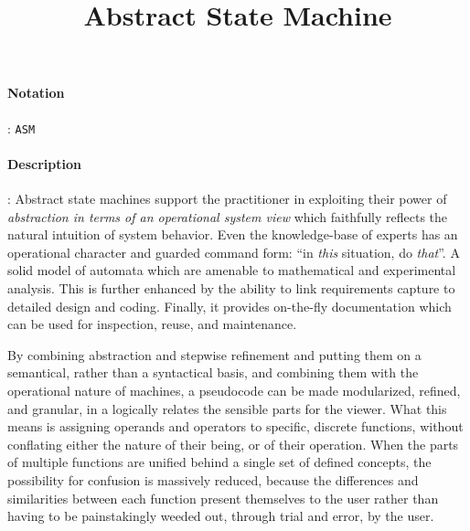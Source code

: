\documentclass[10pt,a4paper,oneside]{scrartcl}
\title{Abstract State Machine}
\date{}
\begin{document}
\maketitle
\paragraph{Notation}: \texttt{ASM}
\paragraph{Description}: Abstract state machines support the practitioner in exploiting their power of \textsl{abstraction in terms of an operational system view} which faithfully reflects the natural intuition of system behavior. Even the knowledge-base of experts has an operational character and guarded command form: ``in \textit{this} situation, do \textit{that}''. A solid model of automata which are amenable to mathematical and experimental analysis. This is further enhanced by the ability to link requirements capture to detailed design and coding. Finally, it provides on-the-fly documentation which can be used for inspection, reuse, and maintenance.
\par 

By combining abstraction and stepwise refinement and putting them on a semantical, rather than a syntactical basis, and combining them with the operational nature of machines, a pseudocode can be made modularized, refined, and granular, in a logically relates the sensible parts for the viewer. What this means is assigning operands and operators to specific, discrete functions, without conflating either the nature of their being, or of their operation. When the parts of multiple functions are unified behind a single set of defined concepts, the possibility for confusion is massively reduced, because the differences and similarities between each function present themselves to the user rather than having to be painstakingly weeded out, through trial and error, by the user.
\par
\end{document}
